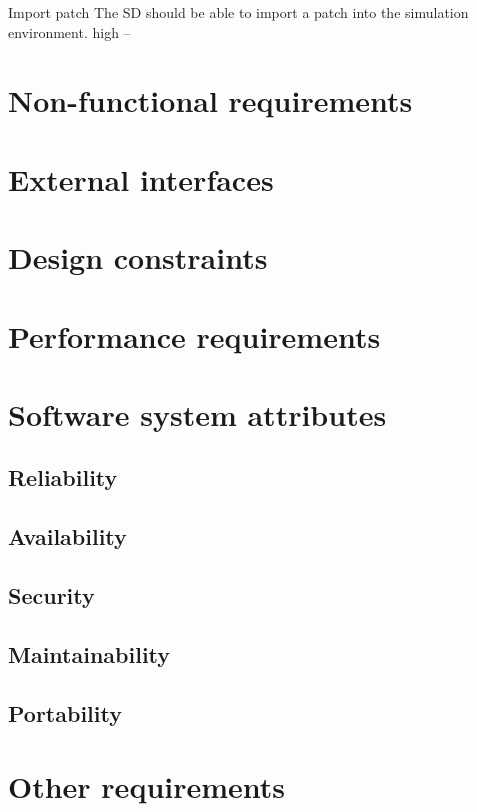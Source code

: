 	{Import patch}
	{The SD should be able to import a patch into the simulation environment.}
	{high}
	{--}
	
	\section{Non-functional requirements}
	\section{External interfaces}
	\section{Design constraints}
	\section{Performance requirements}
	\section{Software system attributes}
		\subsection{Reliability}
		\subsection{Availability}
		\subsection{Security}
		\subsection{Maintainability}
		\subsection{Portability}
	\section{Other requirements}